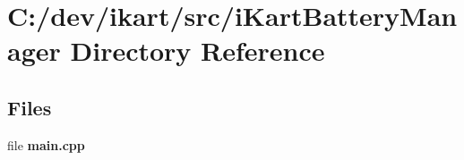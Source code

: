 \section{C\+:/dev/ikart/src/i\+Kart\+Battery\+Manager Directory Reference}
\label{dir_7781abbb08dbf6f7d0520cecf7700c82}
\subsection*{Files}
\begin{DoxyCompactItemize}
\item 
file {\bfseries main.\+cpp}
\end{DoxyCompactItemize}
